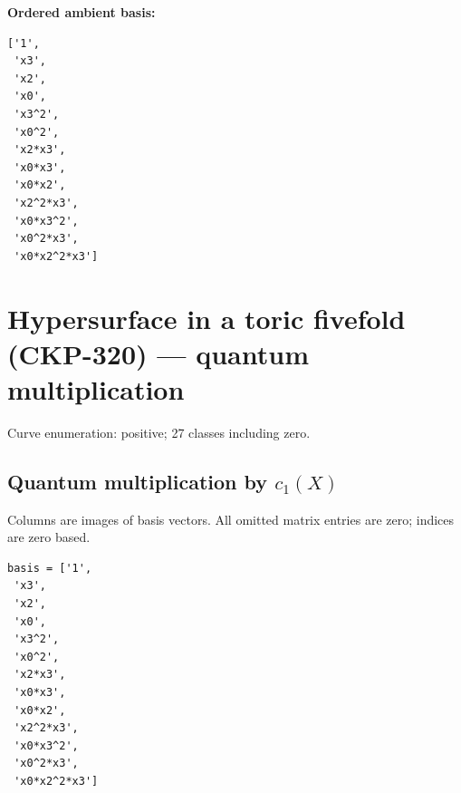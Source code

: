 \documentclass[10pt,a4paper]{article}
\begin{document}
\textbf{Ordered ambient basis:}
\begin{lstlisting}
['1',
 'x3',
 'x2',
 'x0',
 'x3^2',
 'x0^2',
 'x2*x3',
 'x0*x3',
 'x0*x2',
 'x2^2*x3',
 'x0*x3^2',
 'x0^2*x3',
 'x0*x2^2*x3']
\end{lstlisting}

\clearpage\section*{Hypersurface in a toric fivefold (CKP-320) --- quantum multiplication}

Curve enumeration: positive; 27 classes including zero.
\subsection*{Quantum multiplication by $c_1(X)$}
Columns are images of basis vectors. All omitted matrix entries are zero; indices are zero based.

\begin{lstlisting}
basis = ['1',
 'x3',
 'x2',
 'x0',
 'x3^2',
 'x0^2',
 'x2*x3',
 'x0*x3',
 'x0*x2',
 'x2^2*x3',
 'x0*x3^2',
 'x0^2*x3',
 'x0*x2^2*x3']
\end{lstlisting}
\end{document}
